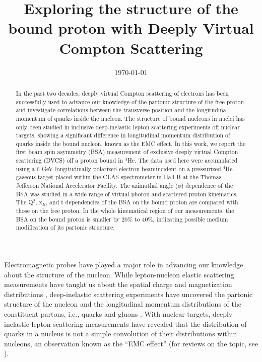 \documentclass[twocolumn,nofootinbib,prl,superscriptaddress,secnumarabic,amssymb,nobibnotes,aps,floatfix]{revtex4}
\begin{document}

\title{Exploring the structure of the bound proton with Deeply Virtual Compton Scattering}



\date{\today}
\begin{abstract}
In the past two decades, deeply virtual Compton scattering of electrons has been successfully 
used to advance our knowledge of the partonic structure of the free proton and investigate 
correlations between the transverse position and the longitudinal momentum of quarks inside 
the nucleon.  The structure of bound nucleons in nuclei has only been studied in inclusive
deep-inelastic lepton scattering experiments off nuclear targets, showing a significant
difference in longitudinal momentum distribution of quarks inside the bound nucleon, known as
the EMC effect.  In this work, we report the first beam spin asymmetry (BSA) measurement of
exclusive deeply virtual Compton scattering (DVCS) off a proton bound in $^4$He.  The data
used here were accumulated using a $6$ GeV longitudinally polarized electron beamincident on
a pressurized $^4$He gaseous target placed within the CLAS spectrometer in Hall-B at the Thomas
Jefferson National Accelerator Facility. The azimuthal angle ($\phi$) dependence of the BSA was
studied in a wide range of virtual photon and scattered proton kinematics. The Q$^2$, x$_B$,
and t dependencies of the BSA on the bound proton are compared with those on the free proton.
In the whole kinematical region of our measurements, the BSA on the bound proton is smaller by
20\% to 40\%, indicating possible medium modification of its partonic structure.
\end{abstract}

\maketitle 

Electromagnetic probes have played a major role in advancing our knowledge 
about the structure of the nucleon. While lepton-nucleon elastic scattering 
measurements have 
taught us about the spatial charge and magnetization distributions 
\cite{Hofstadter:1955ae,Perdrisat:2006hj}, deep-inelastic scattering 
experiments have uncovered the partonic structure of the nucleon and 
the longitudinal momentum distributions of the constituent partons, i.e., 
quarks and gluons \cite{pdg}.  With nuclear targets, deeply inelastic lepton 
scattering measurements have revealed that the distribution of quarks in a 
nucleus is not a simple convolution of their distributions within nucleons, an 
observation known as the ``EMC effect''\cite{EMC_first} (for reviews on the 
topic, see  \cite{Arneodo:1992wf,Geesaman:1995yd,Norton:2003cb,Hen:2016kwk}).
\end{document}
